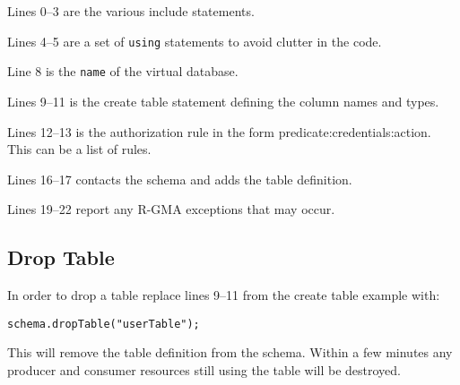 Lines 0--3 are the various include statements.

Lines 4--5 are a set of \texttt{using} statements to avoid clutter
in the code.

Line 8 is the \texttt{name} of the virtual database.

Lines 9--11 is the create table statement defining the column names
and types.

Lines 12--13 is the authorization rule in the form
predicate:credentials:action. This can be a list of rules.

Lines 16--17 contacts the schema and adds the table definition.

Lines 19--22 report any R-GMA exceptions that may occur.



\subsection {Drop Table}
\label{sec:dropTable}

In order to drop a table replace lines 9--11 from the create table example
with:
\begin{verbatim}
schema.dropTable("userTable");
\end{verbatim}
This will remove the table definition from the schema. Within a few
minutes any producer and consumer resources still using the table will
be destroyed.
